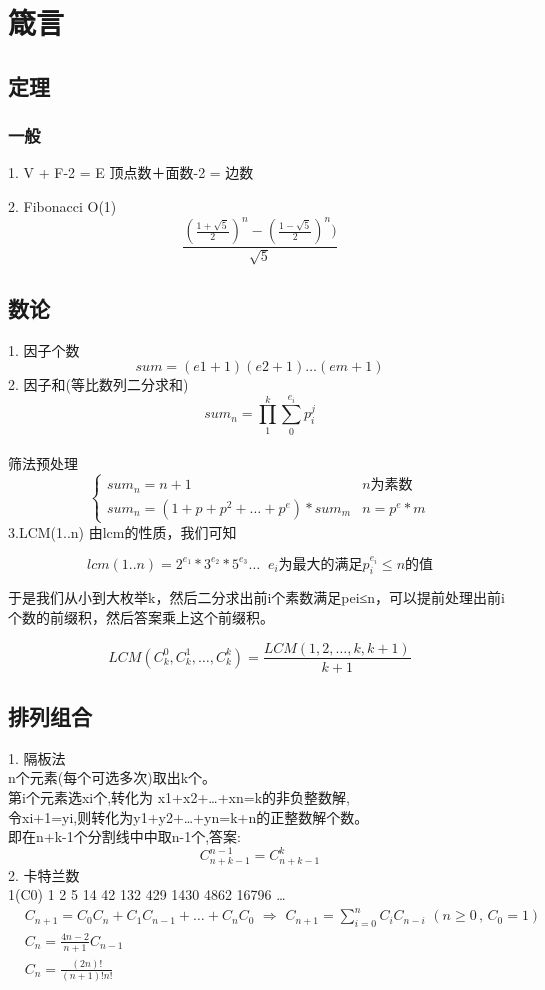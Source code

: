 \documentclass{article}
\begin{document}



\section{箴言}

\subsection{定理}
\subsubsection{一般}
1. V + F-2 = E 顶点数＋面数-2 = 边数

2. Fibonacci O(1)$$\frac{ ( \frac{1+\sqrt{5}}{2} )^n - (\frac{1-\sqrt{5}}{2})^n ) }{ \sqrt{5} }$$

\newpage
\subsection{数论}
1. 因子个数
$$sum=(e1+1)(e2+1)…(em+1)$$
2. 因子和(等比数列二分求和)
$$sum_n=\prod_1^k \sum_0^{e_i}p_i^j$$\\
筛法预处理
$$\begin{cases}
sum_n = n+1  &n为素数    \\
sum_n = (1 + p + p^2 + … + p^e)*sum_m  & n = p^e*m
\end{cases}
$$
3.LCM(1..n)
由lcm的性质，我们可知

$$lcm(1..n) = 2^{e_1} * 3^{e_2} * 5^{e_3} … \;\; e_i \text{为最大的满足} p_i^{e_i} \le n \text{的值}$$

于是我们从小到大枚举k，然后二分求出前i个素数满足pei≤n，可以提前处理出前i个数的前缀积，然后答案乘上这个前缀积。

$$LCM(C_k^0,C_k^1,…,C_k^k) = \frac{LCM(1,2,…,k,k+1)}{k+1}$$
\newpage
\subsection{排列组合}
1. 隔板法	\\
n个元素(每个可选多次)取出k个。	\\
第i个元素选xi个,转化为 x1+x2+…+xn=k的非负整数解,		\\
令xi+1=yi,则转化为y1+y2+…+yn=k+n的正整数解个数。		\\
即在n+k-1个分割线中中取n-1个,答案:
$$C_{n+k-1}^{n-1}=C_{n+k-1}^{k}$$
2. 卡特兰数	\\
1(C0) 1 2 5 14 42 132 429 1430 4862 16796 …	\\
$$\begin{aligned}
&C_{n+1}=C_0C_n+C_1C_{n-1}+…+C_nC_0 \,\, \Rightarrow  \,\, C_{n+1}= \sum_{i=0}^n C_iC_{n-i} \,\, (n \ge 0 \, , \,C_0=1)	\\
&C_{n}=\frac{4n-2}{n+1}C_{n-1}	\\
&C_n=\frac{(2n)!}{(n+1)!n!}
\end{aligned}
$$
\newpage
\end{document}
